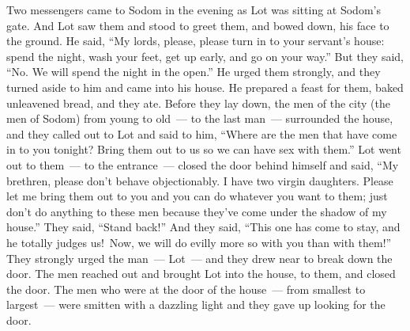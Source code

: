 \begin{inparaenum}
   Two messengers came to Sodom in the evening as Lot was sitting at Sodom's gate. And Lot saw them and stood to greet them, and bowed down, his face to the ground.%
   He said, ``My lords, please, please turn in to your servant's house: spend the night, wash your feet, get up early, and go on your way.'' But they said, ``No. We will spend the night in the open.''%
   He urged them strongly, and they turned aside to him and came into his house. He prepared a feast for them, baked unleavened bread, and they ate.%
   Before they lay down, the men of the city (the men of Sodom) from young to old~--- to the last man~--- surrounded the house,%
   and they called out to Lot and said to him, ``Where are the men that have come in to you tonight? Bring them out to us so we can have sex with them.''%
   Lot went out to them~--- to the entrance~--- closed the door behind himself%
   and said, ``My brethren, please don't behave objectionably.%
   I have two virgin daughters. Please let me bring them out to you and you can do whatever you want to them; just don't do anything to these men because they've come under the shadow of my house.''%
   They said, ``Stand back!'' And they said, ``This one has come to stay, and he totally judges us!\understood{}\ Now, we will do evilly more so with you than with them!'' They strongly urged the man~--- Lot~--- and they drew near to break down the door.%
   The men reached out and brought Lot into the house, to them, and closed the door.%
   The men who were at the door of the house~--- from smallest to largest~--- were smitten with a dazzling light and they gave up looking for the door.%

\end{inparaenum}
